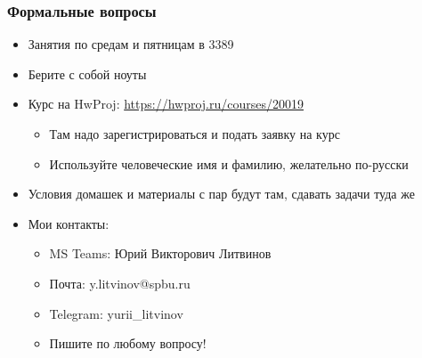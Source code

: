 \documentclass{../../slides-style}
\begin{document}
    \begin{frame}[plain]
        \titlepage
    \end{frame}

    \begin{frame}
        \frametitle{Формальные вопросы}
        \begin{itemize}
            \item Занятия по средам и пятницам в 3389
            \item Берите с собой ноуты
            \item Курс на HwProj: \url{https://hwproj.ru/courses/20019}
            \begin{itemize}
                \item Там надо зарегистрироваться и подать заявку на курс
                \item Используйте человеческие имя и фамилию, желательно по-русски
            \end{itemize}
            \item Условия домашек и материалы с пар будут там, сдавать задачи туда же
            \item Мои контакты:
            \begin{itemize}
                \item MS Teams: Юрий Викторович Литвинов
                \item Почта: y.litvinov@spbu.ru
                \item Telegram: yurii\_litvinov
                \item Пишите по любому вопросу!
            \end{itemize}
        \end{itemize}
    \end{frame}
\end{document}
